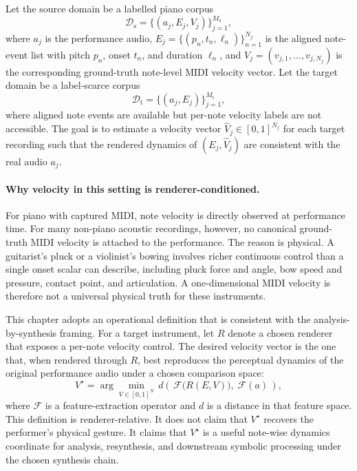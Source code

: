 Let the source domain be a labelled piano corpus
\begin{equation}
\mathcal{D}_{\mathrm{s}} = \bigl\{(a_j, E_j, V_j)\bigr\}_{j=1}^{M_{\mathrm{s}}},
\label{eq:bp_source_domain}
\end{equation}
where $a_j$ is the performance audio, $E_j = \{(p_n, t_n, \ell_n)\}_{n=1}^{N_j}$ is the aligned note-event list with pitch $p_n$, onset $t_n$, and duration $\ell_n$, and $V_j = (v_{j,1}, \ldots, v_{j,N_j})$ is the corresponding ground-truth note-level MIDI velocity vector. Let the target domain be a label-scarce corpus
\begin{equation}
\mathcal{D}_{\mathrm{t}} = \bigl\{(a_j, E_j)\bigr\}_{j=1}^{M_{\mathrm{t}}},
\label{eq:bp_target_domain}
\end{equation}
where aligned note events are available but per-note velocity labels are not accessible. The goal is to estimate a velocity vector $\hat{V}_j \in [0,1]^{N_j}$ for each target recording such that the rendered dynamics of $(E_j, \hat{V}_j)$ are consistent with the real audio $a_j$.

\paragraph{Why velocity in this setting is renderer-conditioned.}
For piano with captured MIDI, note velocity is directly observed at performance time. For many non-piano acoustic recordings, however, no canonical ground-truth MIDI velocity is attached to the performance. The reason is physical. A guitarist's pluck or a violinist's bowing involves richer continuous control than a single onset scalar can describe, including pluck force and angle, bow speed and pressure, contact point, and articulation. A one-dimensional MIDI velocity is therefore not a universal physical truth for these instruments.

This chapter adopts an operational definition that is consistent with the analysis-by-synthesis framing. For a target instrument, let $R$ denote a chosen renderer that exposes a per-note velocity control. The desired velocity vector is the one that, when rendered through $R$, best reproduces the perceptual dynamics of the original performance audio under a chosen comparison space:
\begin{equation}
V^{\star} = \arg\min_{V \in [0,1]^{N}}
\, d\!\left(\,\mathcal{F}\!\bigl(R(E, V)\bigr),\; \mathcal{F}(a)\,\right),
\label{eq:bp_latent_velocity}
\end{equation}
where $\mathcal{F}$ is a feature-extraction operator and $d$ is a distance in that feature space. This definition is renderer-relative. It does not claim that $V^{\star}$ recovers the performer's physical gesture. It claims that $V^{\star}$ is a useful note-wise dynamics coordinate for analysis, resynthesis, and downstream symbolic processing under the chosen synthesis chain.

